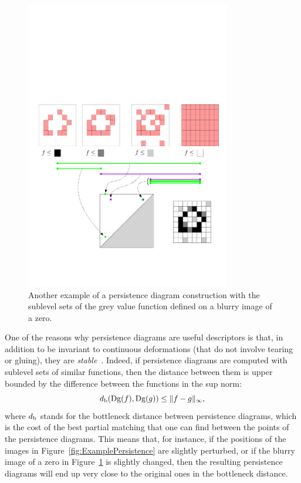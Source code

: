 \begin{figure}[h]\centering
\includegraphics[width=0.8\textwidth]{figures/ExamplePersistence2}
\caption[Persistence diagram of image]{\label{fig:blurryzero} Another example of a persistence diagram construction with the sublevel sets of the 
grey value function defined on a blurry image of a zero.}
\end{figure}	

One of the reasons why persistence diagrams are useful descriptors is that, in addition to be invariant to continuous deformations (that do not involve tearing or gluing), 
they are {\em stable}~\cite{Chazal09a,Cohen07}. Indeed, if persistence diagrams
are computed with sublevel sets of similar functions, 
then the distance between them  is upper bounded by the difference between the functions in the sup norm:
$$d_{\rm b}(\mathrm{Dg}(f),\mathrm{Dg}(g))\leq \|f-g\|_\infty,$$ where $d_{\rm b}$ stands for the bottleneck distance between persistence diagrams,
which is the cost of the best partial matching that one can find between the points of the persistence diagrams.
This means that, for instance, if the positions of the images in Figure~\ref{fig:ExamplePersistence} are slightly perturbed, 
or if the blurry image of a zero in Figure~\ref{fig:blurryzero} is slightly changed, then the 
resulting persistence diagrams will end up very close to the original ones in the bottleneck distance.


